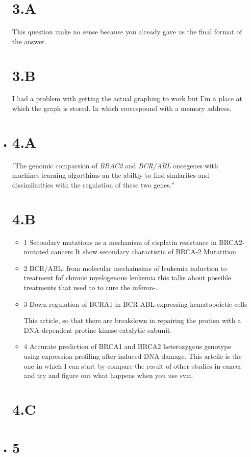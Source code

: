 \documentclass[12pt]{article}
\begin{document}
\begin{itemize}
\part{3.A}
This question make no sense because you already gave us the final format of the answer.

\part{3.B }
I had a problem with getting the actual graphing to work but I'm a place at which the graph is stored. In which correspound with a memory address. 
	\item
\part{4.A}
"The genomic comparsion of \textit{BRAC2} and \textit{BCR/ABL}  oncegenes with  machines learning algorthims an the abiltiy to find simlarites and  dissimilarities with the regulation of these two genes."
\part{4.B}
		\begin{itemize}
			\item{1}
				Secondary mutations as a mechanism of cisplatin resistance in BRCA2-mutated cancers 
				It show secondary charactistic of BRCA-2 Mutatition 
			\item{2}
				BCR/ABL: from molecular mechainsims of leukemia induction to treatment fof chronic myelogenous leukemia 
				this talks about possible treatments that used to to cure the inferon-\mathrm{\aplha}.
			\item{3}
				Down-regulation of BCRA1 in BCR-ABL-expressing hematopoietic cells

				This article, so that there are breakdown in repairing the protien with a DNA-dependent protine kinase catalytic subunit.
			\item{4}
				Accurate prediction of BRCA1 and BRCA2 heterozygous genotype using expression profiling after induced DNA damage.
				This artcile is the one in which I can start by compare the result of other studies in cancer and try and figure out what happens when you use svm.
		\end{itemize}
\part{4.C}
 
	\item
\part{5}
\end{itemize}
\end{document}
